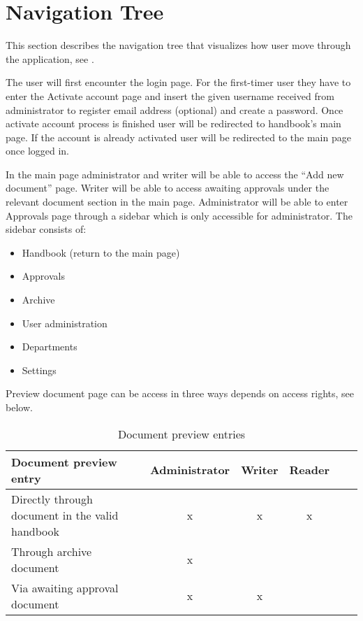 \section{Navigation Tree}
This section describes the navigation tree that visualizes how user move through the application, see .


The user will first encounter the login page.
For the first-timer user they have to enter the Activate account page and insert the given username received from administrator to register email address (optional) and create a password.
Once activate account process is finished user will be redirected to handbook's main page.
If the account is already activated user will be redirected to the main page once logged in.

In the main page administrator and writer will be able to access the ``Add new document'' page.
Writer will be able to access awaiting approvals under the relevant document section in the main page.
Administrator will be able to enter Approvals page through a sidebar which is only accessible for administrator.
The sidebar consists of:

\begin{itemize}
	\item Handbook (return to the main page)
	\item Approvals
	\item Archive
	\item User administration
	\item Departments
	\item Settings
\end{itemize}

Preview document page can be access in three ways depends on access rights, see  below.

\begin{table}[H]
	\begin{center}
	\begin{tabular}{| m{20em} | c | c | c | c | c |}
		\hline
		Document preview entry & Administrator & Writer & Reader \\
		\hline
		 Directly through document in the valid handbook & x  & x & x\\
		\hline
		 Through archive document  & x &  & \\
		\hline
		 Via awaiting approval document & x & x &  \\
		\hline
	\end{tabular}
	\end{center}
	\caption{Document preview entries}\label{tab:docPreviewEntries}
\end{table}

